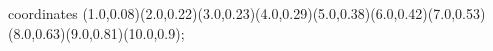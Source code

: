 					coordinates { (1.0,0.08)(2.0,0.22)(3.0,0.23)(4.0,0.29)(5.0,0.38)(6.0,0.42)(7.0,0.53)(8.0,0.63)(9.0,0.81)(10.0,0.9)};